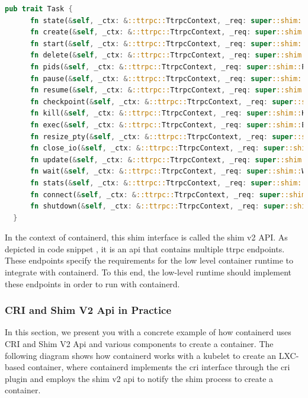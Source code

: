  \begin{lstlisting}[language=rust, basicstyle=\small, caption={Shim V2 Api}, title={Shim V2 Api}, label={shim_v2}]
  pub trait Task {
      fn state(&self, _ctx: &::ttrpc::TtrpcContext, _req: super::shim::StateRequest)
      fn create(&self, _ctx: &::ttrpc::TtrpcContext, _req: super::shim::CreateTaskRequest)
      fn start(&self, _ctx: &::ttrpc::TtrpcContext, _req: super::shim::StartRequest)
      fn delete(&self, _ctx: &::ttrpc::TtrpcContext, _req: super::shim::DeleteRequest)
      fn pids(&self, _ctx: &::ttrpc::TtrpcContext, _req: super::shim::PidsRequest)
      fn pause(&self, _ctx: &::ttrpc::TtrpcContext, _req: super::shim::PauseRequest)
      fn resume(&self, _ctx: &::ttrpc::TtrpcContext, _req: super::shim::ResumeRequest)
      fn checkpoint(&self, _ctx: &::ttrpc::TtrpcContext, _req: super::shim::CheckpointTaskRequest)
      fn kill(&self, _ctx: &::ttrpc::TtrpcContext, _req: super::shim::KillRequest)
      fn exec(&self, _ctx: &::ttrpc::TtrpcContext, _req: super::shim::ExecProcessRequest)
      fn resize_pty(&self, _ctx: &::ttrpc::TtrpcContext, _req: super::shim::ResizePtyRequest)
      fn close_io(&self, _ctx: &::ttrpc::TtrpcContext, _req: super::shim::CloseIORequest)
      fn update(&self, _ctx: &::ttrpc::TtrpcContext, _req: super::shim::UpdateTaskRequest)
      fn wait(&self, _ctx: &::ttrpc::TtrpcContext, _req: super::shim::WaitRequest)
      fn stats(&self, _ctx: &::ttrpc::TtrpcContext, _req: super::shim::StatsRequest)
      fn connect(&self, _ctx: &::ttrpc::TtrpcContext, _req: super::shim::ConnectRequest)
      fn shutdown(&self, _ctx: &::ttrpc::TtrpcContext, _req: super::shim::ShutdownRequest)
  }
  \end{lstlisting}
  
In the context of containerd, this shim interface is called the shim v2 API. As depicted in code snippet , it is an api that contains multiple ttrpc endpoints. These endpoints specify the requirements for the low level container runtime 
to integrate with containerd. To this end, the low-level runtime should implement these endpoints in order to run with containerd.


\subsubsection{CRI and Shim V2 Api in Practice}
In this section, we present you with a concrete example of how containerd uses CRI and Shim V2 Api and 
various components to create a container. The following diagram shows how containerd works with a kubelet to create an LXC-based container, where containerd implements the cri interface 
through the cri plugin and employs the shim v2 api to notify the shim process to create a container.

